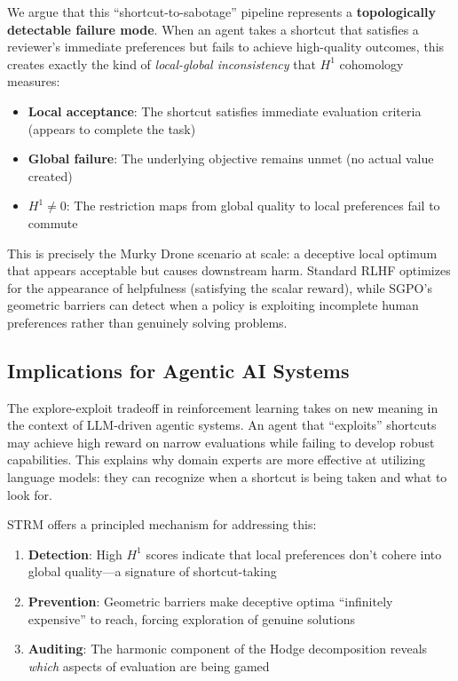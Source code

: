We argue that this ``shortcut-to-sabotage'' pipeline represents a \textbf{topologically detectable failure mode}. When an agent takes a shortcut that satisfies a reviewer's immediate preferences but fails to achieve high-quality outcomes, this creates exactly the kind of \emph{local-global inconsistency} that $H^1$ cohomology measures:

\begin{itemize}
    \item \textbf{Local acceptance}: The shortcut satisfies immediate evaluation criteria (appears to complete the task)
    \item \textbf{Global failure}: The underlying objective remains unmet (no actual value created)
    \item \textbf{$H^1 \neq 0$}: The restriction maps from global quality to local preferences fail to commute
\end{itemize}

This is precisely the Murky Drone scenario at scale: a deceptive local optimum that appears acceptable but causes downstream harm. Standard RLHF optimizes for the appearance of helpfulness (satisfying the scalar reward), while SGPO's geometric barriers can detect when a policy is exploiting incomplete human preferences rather than genuinely solving problems.

\subsection{Implications for Agentic AI Systems}

The explore-exploit tradeoff in reinforcement learning takes on new meaning in the context of LLM-driven agentic systems. An agent that ``exploits'' shortcuts may achieve high reward on narrow evaluations while failing to develop robust capabilities. This explains why domain experts are more effective at utilizing language models: they can recognize when a shortcut is being taken and what to look for.

STRM offers a principled mechanism for addressing this:
\begin{enumerate}
    \item \textbf{Detection}: High $H^1$ scores indicate that local preferences don't cohere into global quality---a signature of shortcut-taking
    \item \textbf{Prevention}: Geometric barriers make deceptive optima ``infinitely expensive'' to reach, forcing exploration of genuine solutions
    \item \textbf{Auditing}: The harmonic component of the Hodge decomposition reveals \emph{which} aspects of evaluation are being gamed
\end{enumerate}

